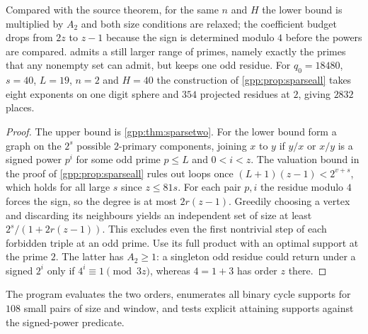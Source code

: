 Compared with the source theorem, for the same $n$ and $H$ the lower bound is multiplied
by $A_2$ and both size conditions are relaxed; the coefficient budget drops from $2z$ to
$z-1$ because the sign is determined modulo $4$ before the powers are compared.
 admits a still larger range of primes, namely exactly the
primes that any nonempty set can admit, but keeps one odd residue. For $q_0=18480$,
$s=40$, $L=19$, $n=2$ and $H=40$ the construction of \cref{gpp:prop:sparseall} takes
eight exponents on one digit sphere and $354$ projected residues at $2$, giving $2832$
places.


\begin{proof}
The upper bound is \cref{gpp:thm:sparsetwo}. For the lower bound form a graph on the
$2^s$ possible $2$-primary components, joining $x$ to $y$ if $y/x$ or $x/y$ is a signed
power $p^i$ for some odd prime $p\le L$ and $0<i<z$. The valuation bound in the proof of
\cref{gpp:prop:sparseall} rules out loops once $(L+1)(z-1)<2^{v+s}$, which holds for all
large $s$ since $z\le81s$. For each pair $p,i$ the residue modulo $4$ forces the sign, so
the degree is at most $2r(z-1)$. Greedily choosing a vertex and discarding its
neighbours yields an independent set of size at least $2^s/(1+2r(z-1))$. This excludes
even the first nontrivial step of each forbidden triple at an odd prime. Use its full
product with an optimal support at the prime $2$. The latter has $A_2\ge1$: a singleton
odd residue could return under a signed $2^i$ only if $4^i\equiv1\pmod{3z}$, whereas
$4=1+3$ has order $z$ there.
\end{proof}

{\gppsloppy The program
 evaluates the
two orders, enumerates all binary cycle supports for $108$ small pairs of size and
window, and tests explicit attaining supports against the signed-power predicate.\par}

